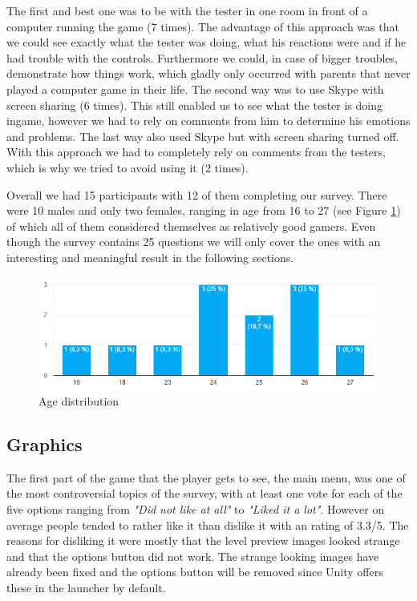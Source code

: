 \documentclass[12pt, letterpaper]{scrartcl}
\begin{document}
	 The first and best one was to be with the tester in one room in front of a computer running the game (7 times). The advantage of this approach was that we could see exactly what the tester was doing, what his reactions were and if he had trouble with the controls. Furthermore we could, in case of bigger troubles, demonstrate how things work, which gladly only occurred with parents that never played a computer game in their life. The second way was to use Skype with screen sharing (6 times). This still enabled us to see what the tester is doing ingame, however we had to rely on comments from him to determine his emotions and problems. The last way also used Skype but with screen sharing turned off. With this approach we had to completely rely on comments from the testers, which is why we tried to avoid using it (2 times).
	 
	 Overall we had 15 participants with 12 of them completing our survey. There were 10 males and only two females, ranging in age from 16 to 27 (see Figure \ref{fig:ageDistribution}) of which all of them considered themselves as relatively good gamers. Even though the survey contains 25 questions we will only cover the ones with an interesting and meaningful result in the following sections. 
	 
	 \begin{figure}[H]
	 	\centering
	 	\includegraphics[width=\textwidth]{images/playtesting/ageDistribution}
	 	\caption{Age distribution}
	 	\label{fig:ageDistribution}
	 \end{figure}
	 
	 \subsection{Graphics}
	 The first part of the game that the player gets to see, the main menu, was one of the most controversial topics of the survey, with at least one vote for each of the five options ranging from \textit{"Did not like at all"} to \textit{"Liked it a lot"}. However on average people tended to rather like it than dislike it with an rating of 3.3/5. The reasons for disliking it were mostly that the level preview images looked strange and that the options button did not work. The strange looking images have already been fixed and the options button will be removed since Unity offers these in the launcher by default.
	 
\end{document}
